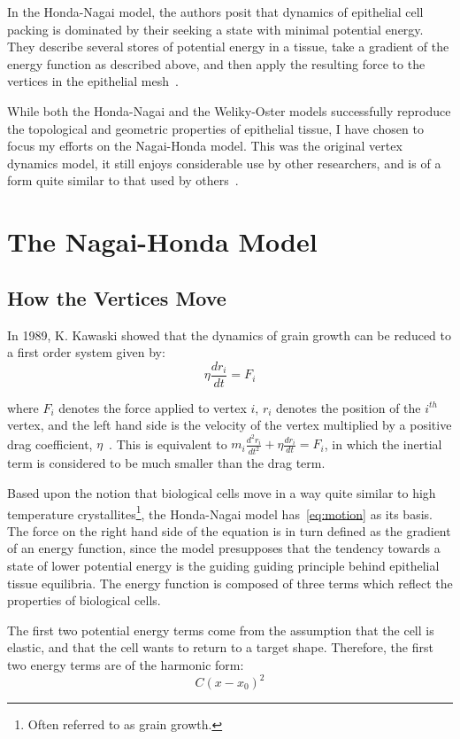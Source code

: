 In the Honda-Nagai model, the authors posit that dynamics of epithelial cell packing is dominated by their seeking a state with minimal potential energy. They describe several stores of potential energy in a tissue, take a gradient of the energy function as described above, and then apply the resulting force to the vertices in the epithelial mesh~\cite{HondaNagai}.

While both the Honda-Nagai and the Weliky-Oster models successfully reproduce the topological and geometric properties of epithelial tissue, I have chosen to focus my efforts on the Nagai-Honda model. This was the original vertex dynamics model, it still enjoys considerable use by other researchers, and is of a form quite similar to that used by others~\cite{Farhadifar}.

\section{The Nagai-Honda Model}
\label{sec:force}
\subsection{How the Vertices Move}
In 1989, K. Kawaski showed that the dynamics of grain growth can be reduced to a first order system given by:
\begin{equation}
\label{eq:motion}
\eta\frac{dr_i}{dt} = F_i
\end{equation}

where $F_i$ denotes the force applied to vertex $i$, $r_i$ denotes the position of the $i^{th}$ vertex,  and the left hand side is the velocity of the vertex multiplied by a positive drag coefficient, $\eta$~\cite{1989Kawasaki}. This is equivalent to $m_i\frac{d^2r_i}{dt^2} + \eta\frac{dr_i}{dt} = F_i$, in which the 
inertial term is considered to be much smaller than the drag term.

Based upon the notion that biological cells move in a way quite similar to high temperature crystallites\footnote{Often referred to as grain growth.}, the Honda-Nagai model has~\ref{eq:motion} as its basis. The force on the right hand side of the equation is in turn defined as the gradient of an energy function, since the model presupposes that the tendency towards a state of lower potential energy is the guiding guiding principle behind epithelial tissue equilibria. The energy function is composed of three terms which reflect the properties of biological cells.

The first two potential energy terms come from the assumption that the cell is elastic, and that the cell wants to return to a target shape. Therefore, the first two energy terms are of the harmonic form: 
\begin{equation}
C(x-x_0)^2
\end{equation}

